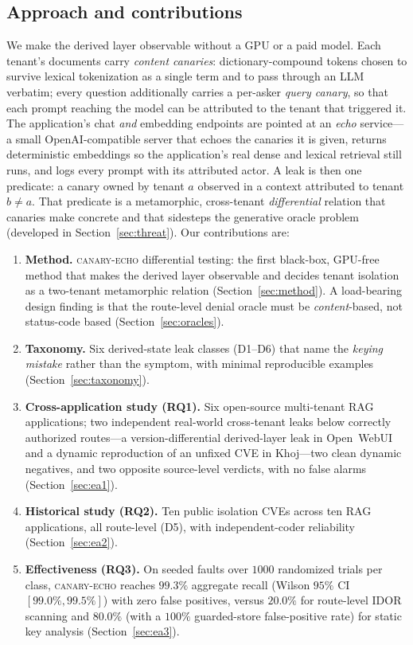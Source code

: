 \IfFileExists{IEEEtran.cls}{\documentclass[conference]{IEEEtran}}{\documentclass[10pt,twocolumn]{article}}
\newcommand{\tool}{\mbox{\textsc{canary-echo}}}
\begin{document}
\subsection{Approach and contributions}
We make the derived layer observable without a GPU or a paid model. Each tenant's documents carry
\emph{content canaries}: dictionary-compound tokens chosen to survive lexical tokenization as a
single term and to pass through an LLM verbatim; every question additionally carries a per-asker
\emph{query canary}, so that each prompt reaching the model can be attributed to the tenant that
triggered it. The application's chat \emph{and} embedding endpoints are pointed at an \emph{echo}
service---a small OpenAI-compatible server that echoes the canaries it is given, returns deterministic
embeddings so the application's real dense and lexical retrieval still runs, and logs every prompt
with its attributed actor. A leak is then one predicate: a canary owned by tenant $a$ observed in a
context attributed to tenant $b\neq a$. That predicate is a metamorphic, cross-tenant
\emph{differential} relation that canaries make concrete and that sidesteps the generative oracle
problem (developed in Section~\ref{sec:threat}). Our contributions are:
\begin{enumerate}
\item \textbf{Method.} \tool{} differential testing: the first black-box, GPU-free method that makes
the derived layer observable and decides tenant isolation as a two-tenant metamorphic relation
(Section~\ref{sec:method}). A load-bearing design finding is that the route-level denial oracle must
be \emph{content}-based, not status-code based (Section~\ref{sec:oracles}).
\item \textbf{Taxonomy.} Six derived-state leak classes (D1--D6) that name the \emph{keying
mistake} rather than the symptom, with minimal reproducible examples
(Section~\ref{sec:taxonomy}).
\item \textbf{Cross-application study (RQ1).} Six open-source multi-tenant RAG applications; two
independent real-world cross-tenant leaks below correctly authorized routes---a version-differential
derived-layer leak in Open~WebUI and a dynamic reproduction of an unfixed CVE in Khoj---two clean
dynamic negatives, and two opposite source-level verdicts, with no false alarms
(Section~\ref{sec:ea1}).
\item \textbf{Historical study (RQ2).} Ten public isolation CVEs across ten RAG applications, all
route-level (D5), with independent-coder reliability (Section~\ref{sec:ea2}).
\item \textbf{Effectiveness (RQ3).} On seeded faults over $1000$ randomized trials per class, \tool{}
reaches $99.3\%$ aggregate recall (Wilson $95\%$ CI $[99.0\%,99.5\%]$) with zero false positives,
versus $20.0\%$ for route-level IDOR scanning and $80.0\%$ (with a $100\%$ guarded-store false-positive
rate) for static key analysis (Section~\ref{sec:ea3}).
\end{enumerate}
\end{document}
